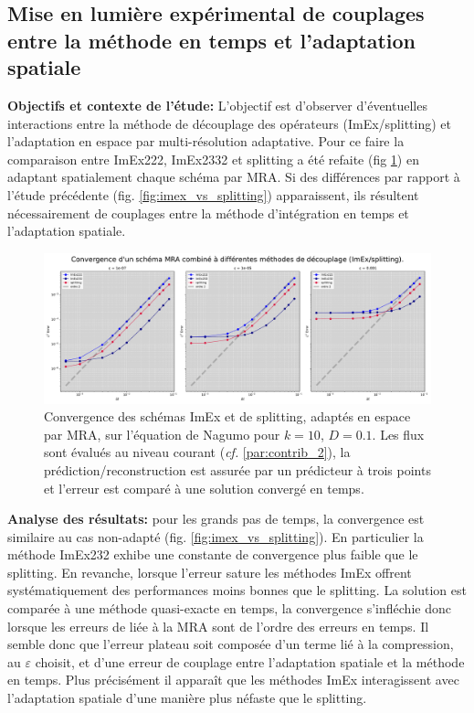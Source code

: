 \subsection{Mise en lumière expérimental de couplages entre la méthode en temps et l'adaptation spatiale}
\label{par:couplagetempsadaptation}
\textbf{Objectifs et contexte de l'étude: }
L'objectif est d'observer d'éventuelles interactions entre la méthode de découplage des opérateurs (ImEx/splitting) et l'adaptation en espace par multi-résolution adaptative.
Pour ce faire la comparaison entre ImEx222, ImEx2332 et splitting a été refaite (fig \ref{fig:couplage-MRA-temps}) en adaptant spatialement chaque schéma par MRA.
Si des différences par rapport à l'étude précédente (fig. \ref{fig:imex_vs_splitting}) apparaissent, ils résultent nécessairement de couplages entre la méthode d'intégration en temps
et l'adaptation spatiale.\par
\begin{figure}[htbp!]
    \centering
    \includegraphics[width=\linewidth]{media/4_travail/2_nagumo/couplage/couplage_MRA_temps.pdf}
    \caption{Convergence des schémas ImEx et de splitting, adaptés en espace par MRA, sur l'équation de Nagumo pour $k=10$, $D=0.1$.
    Les flux sont évalués au niveau courant (\textit{cf.} \ref{par:contrib_2}), la prédiction/reconstruction est assurée par un prédicteur à trois points et l'erreur est comparé à une solution convergé en temps.}
    \label{fig:couplage-MRA-temps}
\end{figure}
\textbf{Analyse des résultats:} pour les grands pas de temps, la convergence est similaire au cas non-adapté (fig. \ref{fig:imex_vs_splitting}). En particulier la méthode
ImEx232 exhibe une constante de convergence plus faible que le splitting. 
En revanche, lorsque l'erreur sature les méthodes ImEx offrent systématiquement des performances moins bonnes que le splitting.
La solution est comparée à une méthode quasi-exacte en temps, la convergence s'infléchie donc lorsque les erreurs de liée à la MRA sont de l'ordre des erreurs en temps.
Il semble donc que l'erreur plateau soit composée d'un terme lié à la compression, au $\varepsilon$ choisit, et d'une erreur de couplage entre l'adaptation spatiale
et la méthode en temps. Plus précisément il apparaît que les méthodes ImEx interagissent avec l'adaptation spatiale d'une manière plus néfaste que le splitting.\\

